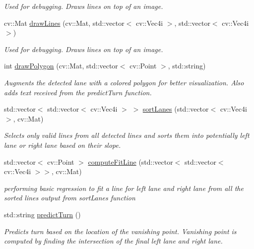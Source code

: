 \begin{DoxyCompactItemize}
\begin{DoxyCompactList}\small\item\em Used for debugging. Draws lines on top of an image. \end{DoxyCompactList}\item 
cv\+::\+Mat \hyperlink{classlanedetector_a714784d2ef657578c3b8bbef5aeb3dd4}{draw\+Lines} (cv\+::\+Mat, std\+::vector$<$ cv\+::\+Vec4i $>$, std\+::vector$<$ cv\+::\+Vec4i $>$)
\begin{DoxyCompactList}\small\item\em Used for debugging. Draws lines on top of an image. \end{DoxyCompactList}\item 
int \hyperlink{classlanedetector_a03607a04461f6f9137a2d97297266d82}{draw\+Polygon} (cv\+::\+Mat, std\+::vector$<$ cv\+::\+Point $>$, std\+::string)
\begin{DoxyCompactList}\small\item\em Augments the detected lane with a colored polygon for better visualization. Also adds text received from the predict\+Turn function. \end{DoxyCompactList}\item 
std\+::vector$<$ std\+::vector$<$ cv\+::\+Vec4i $>$ $>$ \hyperlink{classlanedetector_a1b9086075ddbe4827f473ce7105c1c27}{sort\+Lanes} (std\+::vector$<$ cv\+::\+Vec4i $>$, cv\+::\+Mat)
\begin{DoxyCompactList}\small\item\em Selects only valid lines from all detected lines and sorts them into potentially left lane or right lane based on their slope. \end{DoxyCompactList}\item 
std\+::vector$<$ cv\+::\+Point $>$ \hyperlink{classlanedetector_a70feae4d9119d7288b54bd7ea79ffb47}{compute\+Fit\+Line} (std\+::vector$<$ std\+::vector$<$ cv\+::\+Vec4i $>$$>$, cv\+::\+Mat)
\begin{DoxyCompactList}\small\item\em performing basic regression to fit a line for left lane and right lane from all the sorted lines output from sort\+Lanes function \end{DoxyCompactList}\item 
std\+::string \hyperlink{classlanedetector_a98a1c156b23a87158f1460df8544b118}{predict\+Turn} ()
\begin{DoxyCompactList}\small\item\em Predicts turn based on the location of the vanishing point. Vanishing point is computed by finding the intersection of the final left lane and right lane. \end{DoxyCompactList}\end{DoxyCompactItemize}


